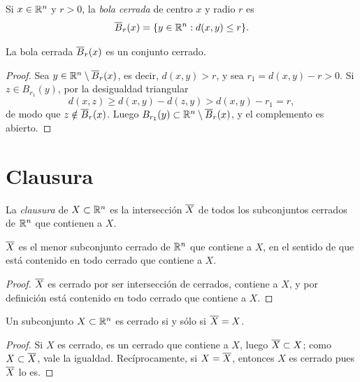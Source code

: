 \begin{definition}
  Si \(x \in \mathbb{R}^n\) y \(r > 0\), la \emph{bola cerrada} de centro \(x\) y radio \(r\) es
  \[
    \overline{B}_r(x) = \{ y \in \mathbb{R}^n : d(x, y) \leq r \}.
  \]
\end{definition}

\begin{prop}
  La bola cerrada \(\overline{B}_r(x)\) es un conjunto cerrado.
\end{prop}

\begin{proof}
  Sea \(y \in \mathbb{R}^n \setminus \overline{B}_r(x)\), es decir, \(d(x, y) > r\), y sea \(r_1 = d(x, y) - r > 0\). Si \(z \in B_{r_1}(y)\), por la desigualdad triangular
  \[
    d(x, z) \geq d(x, y) - d(z, y) > d(x, y) - r_1 = r,
  \]
  de modo que \(z \notin \overline{B}_r(x)\). Luego \(B_{r_1}(y) \subset \mathbb{R}^n \setminus \overline{B}_r(x)\), y el complemento es abierto.
\end{proof}

\section{Clausura}

\begin{definition}[Clausura]
  La \emph{clausura} de \(X \subset \mathbb{R}^n\) es la intersección \(\overline{X}\) de todos los subconjuntos cerrados de \(\mathbb{R}^n\) que contienen a \(X\).
\end{definition}

\begin{prop}
  \(\overline{X}\) es el menor subconjunto cerrado de \(\mathbb{R}^n\) que contiene a \(X\), en el sentido de que está contenido en todo cerrado que contiene a \(X\).
\end{prop}

\begin{proof}
  \(\overline{X}\) es cerrado por ser intersección de cerrados, contiene a \(X\), y por definición está contenido en todo cerrado que contiene a \(X\).
\end{proof}

\begin{corollary}
  Un subconjunto \(X \subset \mathbb{R}^n\) es cerrado si y sólo si \(\overline{X} = X\).
\end{corollary}

\begin{proof}
  Si \(X\) es cerrado, es un cerrado que contiene a \(X\), luego \(\overline{X} \subset X\); como \(X \subset \overline{X}\), vale la igualdad. Recíprocamente, si \(X = \overline{X}\), entonces \(X\) es cerrado pues \(\overline{X}\) lo es.
\end{proof}

